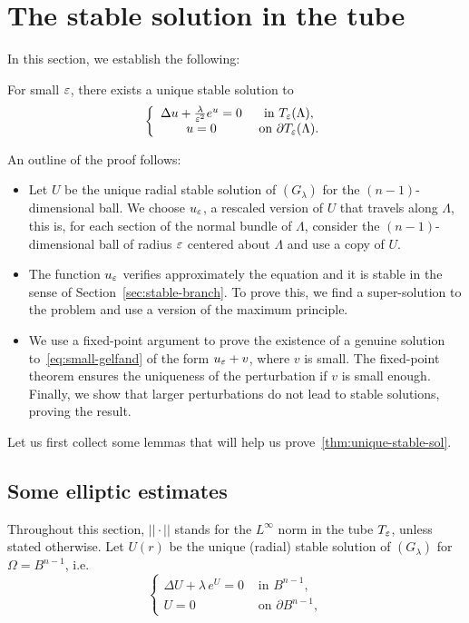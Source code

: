 \section{The stable solution in the tube}\label{sec:stable-sol-in-tube}

In this section, we establish the following:

\begin{theorem}\label{thm:unique-stable-sol}
    For small $\varepsilon$, there exists a unique stable solution to
    \begin{equation}
        \label{eq:small-gelfand}
        \left\{
            \begin{array}{cc}
                \Delta u + \frac{\lambda}{\varepsilon^2}e^u=0 & \mbox{ in }T_\varepsilon(\Lambda),\\
                u = 0 & \mbox{ on }\partial T_\varepsilon(\Lambda).
            \end{array}
        \right.
    \end{equation}
\end{theorem}

\noindent An outline of the proof follows:

\begin{itemize}
    \item Let $U$ be the unique radial stable solution of $(G_\lambda)$ for the
        $(n-1)$-dimensional ball. We choose $u_\varepsilon$, a rescaled version of $U$ that
        travels along $\Lambda$, this is, for each section of the normal
        bundle of $\Lambda$, consider the $(n-1)$-dimensional ball of radius $\varepsilon$
        centered about $\Lambda$ and use a copy of $U$.
    \item The function $u_\varepsilon$ verifies approximately the equation and it is stable
        in the sense of Section~\ref{sec:stable-branch}. To prove this, we find a
        super-solution to the problem and use a version of the maximum principle.
    \item We use a fixed-point argument to prove the existence of a genuine solution
        to~\ref{eq:small-gelfand} of the form $u_\varepsilon+v$, where $v$ is small. The
        fixed-point theorem ensures the uniqueness of the perturbation if $v$ is small
        enough. Finally, we show that larger perturbations do not lead to stable
        solutions, proving the result.
\end{itemize}

Let us first collect some lemmas that will help us
prove~\ref{thm:unique-stable-sol}.
\subsection{Some elliptic estimates}
Throughout this section, $||\cdot||$
stands for the $L^\infty$ norm in the tube
$T_\varepsilon$, unless stated otherwise. Let $U(r)$ be the unique (radial) stable
solution of $(G_\lambda)$ for $\Omega = B^{n-1}$, i.e.
\begin{equation}
    \left\{\begin{array}{cc}
            \Delta U + \lambda\, e^U=0 & \mbox{ in }B^{n-1},\\
            U = 0 & \mbox{ on }\partial B^{n-1},
    \end{array}\right.
\end{equation}

